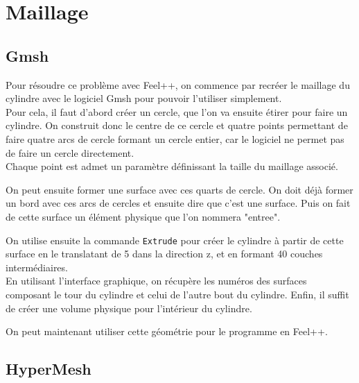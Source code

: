 \chapter{Maillage}
\label{mesh}
\section{Gmsh}
\label{cylindre}

Pour résoudre ce problème avec Feel++, on commence par recréer le maillage du cylindre avec le logiciel Gmsh pour pouvoir l'utiliser simplement.\\
Pour cela, il faut d'abord créer un cercle, que l'on va ensuite étirer pour faire un cylindre. On construit donc le centre de ce cercle et quatre points permettant de faire quatre arcs de cercle formant un cercle entier, car le logiciel ne permet pas de faire un cercle directement.\\
Chaque point est admet un paramètre définissant la taille du maillage associé.



On peut ensuite former une surface avec ces quarts de cercle. On doit déjà former un bord avec ces arcs de cercles et ensuite dire que c'est une surface. Puis on fait de cette surface un élément physique que l'on nommera "entree".



On utilise ensuite la commande \texttt{Extrude} pour créer le cylindre à partir de cette surface en le translatant de 5 dans la direction z, et en formant 40 couches intermédiaires.\\
En utilisant l'interface graphique, on récupère les numéros des surfaces composant le tour du cylindre et celui de l'autre bout du cylindre. Enfin, il suffit de créer une volume physique pour l'intérieur du cylindre.



On peut maintenant utiliser cette géométrie pour le programme en Feel++.

\section{HyperMesh}


